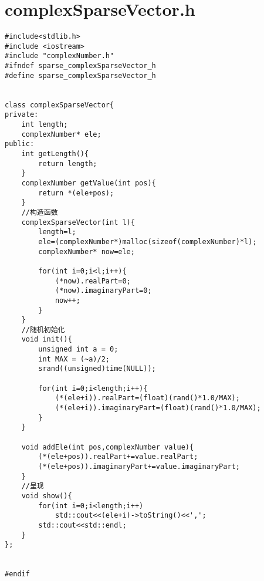 \section{complexSparseVector.h}
\begin{lstlisting}
#include<stdlib.h>
#include <iostream>
#include "complexNumber.h"
#ifndef sparse_complexSparseVector_h
#define sparse_complexSparseVector_h


class complexSparseVector{
private:
    int length;
    complexNumber* ele;
public:
    int getLength(){
        return length;
    }
    complexNumber getValue(int pos){
        return *(ele+pos);
    }
    //构造函数
    complexSparseVector(int l){
        length=l;
        ele=(complexNumber*)malloc(sizeof(complexNumber)*l);
        complexNumber* now=ele;
        
        for(int i=0;i<l;i++){
            (*now).realPart=0;
            (*now).imaginaryPart=0;
            now++;
        }
    }
    //随机初始化
    void init(){
        unsigned int a = 0;
        int MAX = (~a)/2;
        srand((unsigned)time(NULL));
        
        for(int i=0;i<length;i++){
            (*(ele+i)).realPart=(float)(rand()*1.0/MAX);
            (*(ele+i)).imaginaryPart=(float)(rand()*1.0/MAX);
        }
    }
    
    void addEle(int pos,complexNumber value){
        (*(ele+pos)).realPart+=value.realPart;
        (*(ele+pos)).imaginaryPart+=value.imaginaryPart;
    }
    //呈现
    void show(){
        for(int i=0;i<length;i++)
            std::cout<<(ele+i)->toString()<<',';
        std::cout<<std::endl;
    }
};


#endif

\end{lstlisting}

